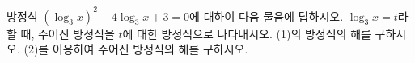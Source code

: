 방정식 $(\log_3 x)^2-4\log_3 x+3=0$에 대하여 다음 물음에 답하시오.
 $\log_3 x=t$라 할 때, 주어진 방정식을 $t$에 대한 방정식으로 나타내시오.
 (1)의 방정식의 해를 구하시오.
 (2)를 이용하여 주어진 방정식의 해를 구하시오.
